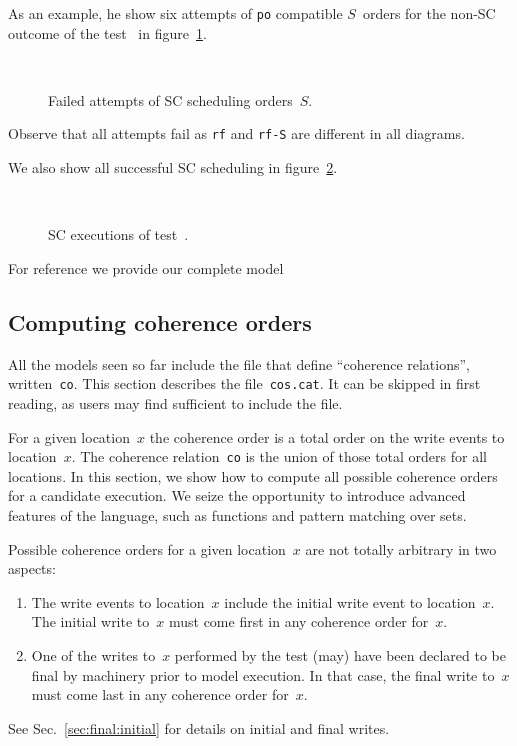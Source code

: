 As an example, he show six attempts of \texttt{po} compatible $S$~orders
for the non-SC outcome of the test~ in figure~\ref{sblamport}.
\begin{figure}[htp]
\caption{\label{sblamport}Failed attempts of SC scheduling orders~$S$.}
\begin{center}
\quad{}\quad{}\\
\quad{}\quad{}
\end{center}
\end{figure}
Observe that all attempts fail as \texttt{rf} and \texttt{rf-S}
are different in all diagrams.

We also show all successful SC scheduling in figure~\ref{sbok}.
\begin{figure}[htp]
\caption{\label{sbok}SC executions of test~.}
\begin{center}
\quad{}\quad{}\\
\quad{}\quad{}
\end{center}
\end{figure}


For reference we provide our complete model~


\subsection{Computing \label{sec:cos}coherence orders}
All the models seen so far include the file  that define
``coherence relations'', written~\texttt{co}.
This section describes the file~\texttt{cos.cat}.
It can be skipped in first reading, as users may find sufficient
to include the file.

For a given location~$x$ the coherence order is a total order on the
write events to location~$x$. The coherence relation~\texttt{co} is the union
of those total orders for all locations.
In this section, we show how to compute all possible coherence orders for
a candidate execution.
We seize the opportunity to introduce advanced features of the \cat{}
language, such as functions and pattern matching over sets.

Possible coherence orders for a given location~$x$
are not totally arbitrary in two aspects:
\begin{enumerate}
\item The write events to location~$x$ include
the initial write event to location~$x$.  The initial write to~$x$ must come
first in any coherence order for~$x$.
\item One of the writes to~$x$ performed by the test (may) have been declared
to be final by \herd{} machinery prior to model execution.
In that case, the final write to~$x$ must come last in any coherence order
for~$x$.
\end{enumerate}
See Sec.~\ref{sec:final:initial} for details on initial and final writes.


